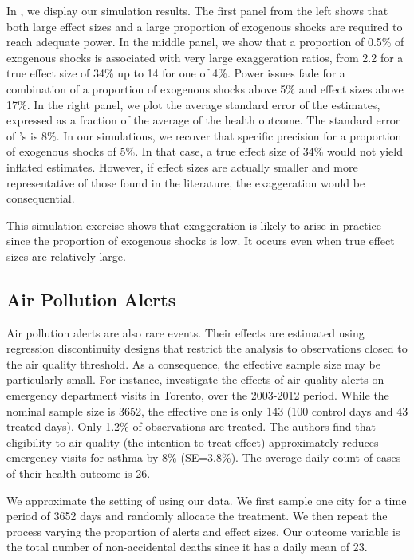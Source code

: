 \documentclass[12pt]{article}
\begin{document}
            In , we display our simulation results. The first panel from the left shows that both large effect sizes and a large proportion of exogenous shocks are required to reach adequate power. In the middle panel, we show that a proportion of 0.5\% of exogenous shocks is associated with very large exaggeration ratios, from 2.2 for a true effect size of 34\% up to 14 for one of 4\%. Power issues fade for a combination of a proportion of exogenous shocks above 5\% and effect sizes above 17\%. In the right panel, we plot the average standard error of the estimates, expressed as a fraction of the average of the health outcome. The standard error of \cite{bauernschuster_when_2017}'s is 8\%. In our simulations, we recover that specific precision for a proportion of exogenous shocks of 5\%. In that case, a true effect size of 34\% would not yield inflated estimates. However, if effect sizes are actually smaller and more representative of those found in the literature, the exaggeration would be consequential.
            
            This simulation exercise shows that exaggeration is likely to arise in practice since the proportion of exogenous shocks is low. It occurs even when true effect sizes are relatively large.
        
        \subsection*{Air Pollution Alerts}
            
            Air pollution alerts are also rare events. Their effects are estimated using regression discontinuity designs that restrict the analysis to observations closed to the air quality threshold. As a consequence, the effective sample size may be particularly small. For instance, \cite{chen_effect_2018} investigate the effects of air quality alerts on emergency department visits in Torento, over the 2003-2012 period. While the nominal sample size is 3652, the effective one is only 143 (100 control days and 43 treated days). Only 1.2\% of observations are treated. The authors find that eligibility to air quality (the intention-to-treat effect) approximately reduces emergency visits for asthma by 8\% (SE=3.8\%). The average daily count of cases of their health outcome is 26.
        
            We approximate the setting of \cite{chen_effect_2018} using our data. We first sample one city for a time period of 3652 days and randomly allocate the treatment. We then repeat the process varying the proportion of alerts and effect sizes. Our outcome variable is the total number of non-accidental deaths since it has a daily mean of 23.
            
\end{document}
